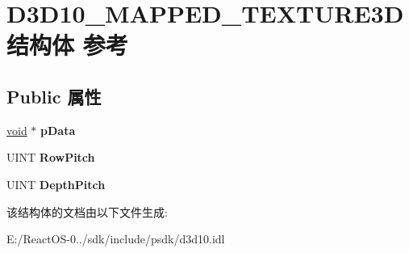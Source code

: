\hypertarget{struct_d3_d10___m_a_p_p_e_d___t_e_x_t_u_r_e3_d}{}\section{D3\+D10\+\_\+\+M\+A\+P\+P\+E\+D\+\_\+\+T\+E\+X\+T\+U\+R\+E3\+D结构体 参考}
\label{struct_d3_d10___m_a_p_p_e_d___t_e_x_t_u_r_e3_d}
\subsection*{Public 属性}
\begin{DoxyCompactItemize}
\item 
\mbox{\label{struct_d3_d10___m_a_p_p_e_d___t_e_x_t_u_r_e3_d_a1ee9eb730e5608d04513c97baa160684}} 
\hyperlink{interfacevoid}{void} $\ast$ {\bfseries p\+Data}
\item 
\mbox{\label{struct_d3_d10___m_a_p_p_e_d___t_e_x_t_u_r_e3_d_a777d60dc2659a9272b09a02ad994488f}} 
U\+I\+NT {\bfseries Row\+Pitch}
\item 
\mbox{\label{struct_d3_d10___m_a_p_p_e_d___t_e_x_t_u_r_e3_d_a76205e019c5c5d99f0a09497b880fa0e}} 
U\+I\+NT {\bfseries Depth\+Pitch}
\end{DoxyCompactItemize}


该结构体的文档由以下文件生成\+:\begin{DoxyCompactItemize}
\item 
E\+:/\+React\+O\+S-\/0../sdk/include/psdk/d3d10.\+idl\end{DoxyCompactItemize}
